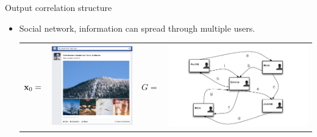 \documentclass[first=dgreen,second=purple,logo=red]{aaltoslides}
\begin{document}
\begin{frame}[allowframebreaks]{Output correlation structure}
\begin{itemize}
		\item Social network, information can spread through multiple users.
		\begin{center}
			\begin{tabular}{cccc} 
		    $\mathbf {x}_0=$ & \multirow{2}{*}{\includegraphics[scale = 0.15]{./figures/facebookvideo.png}}
			&$G=$& \multirow{2}{*}{\includegraphics[scale = 0.2]{./figures/motivation_1.pdf}}\\
		    \end{tabular}
		\newline
		\newline
		\newline
		\newline

\end{center}
\end{itemize}
\end{frame}
\end{document}
